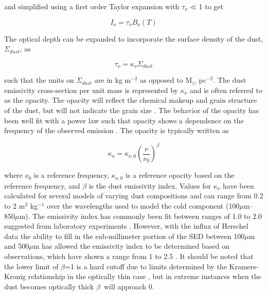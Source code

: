 \noindent and simplified using a first order Taylor expansion with $\tau_\nu \ll$1 to get

\begin{equation}\label{eq:mbb_optd}
  I_\nu = \tau_\nu B_\nu\left(T\right)
\end{equation}

\noindent The optical depth can be expanded to incorporate the surface density of the dust, $\Sigma_{dust}$, as

\begin{equation}\label{eq:mbb_optd_def}
  \tau_\nu = \kappa_\nu \Sigma_{dust}
\end{equation}

\noindent such that the units on $\Sigma_{dust}$ are in kg m$^{-2}$ as opposed to M$_\odot$ pc$^{-2}$.  The dust emissivity cross-section per unit mass is represented by $\kappa_\nu$ and is often referred to as the opacity.  The opacity will reflect the chemical makeup and grain structure of the dust, but will not indicate the grain size \citep{planckXI2013}.  The behavior of the opacity has been well fit with a power law such that opacity shows a dependence on the frequency of the observed emission \citep{hildebrand1983}.  The opacity is typically written as 

\begin{equation}\label{eq:mbb_kapp}
  \kappa_\nu = \kappa_{\nu,0}\left(\frac{\nu}{\nu_0}\right)^\beta
\end{equation}

\noindent where $\nu_0$ is a reference frequency, $\kappa_{\nu,0}$ is a reference opacity based on the reference frequency, and $\beta$ is the dust emissivity index.  Values for $\kappa_\nu$ have been calculated for several models of varying dust compositions and can range from 0.2 to 2 m$^2$ kg$^{-1}$ over the wavelengths used to model the cold component (100$\mu$m--850$\mu$m)\citep{li2001}.  The emissivity index has commonly been fit between ranges of 1.0 to 2.0  suggested from laboratory experiments \citep{walcher2011}.  However, with the influx of Herschel data the ability to fill in the sub-millimeter portion of the SED between 100$\mu$m and 500$\mu$m has allowed the emissivity index to be determined based on observations, which have shown a range from 1 to 2.5 \citep{galametz2012}.  It should be noted that the lower limit of $\beta$=1 is a hard cutoff due to limits determined by the Kramers-Kronig relationship in the optically thin case \citep{li2005}, but in extreme instances when the dust becomes optically thick $\beta$\ will approach 0.

